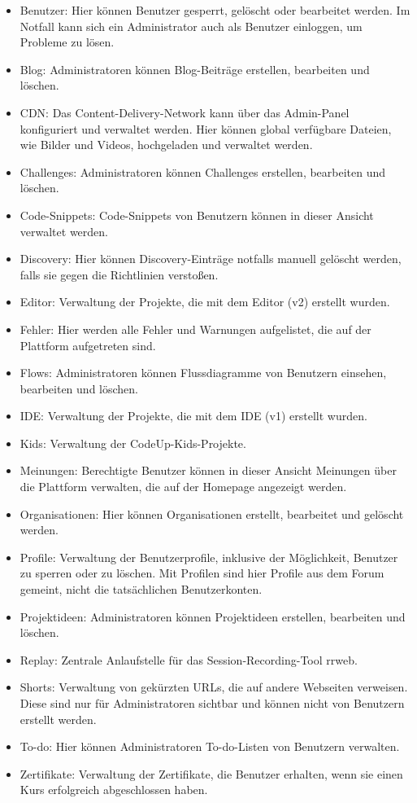 \documentclass[main.tex]{subfiles}
\begin{document}
    \begin{itemize}
        \item Benutzer: Hier können Benutzer gesperrt, gelöscht oder bearbeitet werden.
        Im Notfall kann sich ein Administrator auch als Benutzer einloggen, um Probleme zu lösen.
        \item Blog: Administratoren können Blog-Beiträge erstellen, bearbeiten und löschen.
        \item CDN: Das Content-Delivery-Network kann über das Admin-Panel konfiguriert und verwaltet werden.
        Hier können global verfügbare Dateien, wie Bilder und Videos, hochgeladen und verwaltet werden.
        \item Challenges: Administratoren können Challenges erstellen, bearbeiten und löschen.
        \item Code-Snippets: Code-Snippets von Benutzern können in dieser Ansicht verwaltet werden.
        \item Discovery: Hier können Discovery-Einträge notfalls manuell gelöscht werden, falls sie gegen die Richtlinien verstoßen.
        \item Editor: Verwaltung der Projekte, die mit dem Editor (v2) erstellt wurden.
        \item Fehler: Hier werden alle Fehler und Warnungen aufgelistet, die auf der Plattform aufgetreten sind.
        \item Flows: Administratoren können Flussdiagramme von Benutzern einsehen, bearbeiten und löschen.
        \item IDE: Verwaltung der Projekte, die mit dem IDE (v1) erstellt wurden.
        \item Kids: Verwaltung der CodeUp-Kids-Projekte.
        \item Meinungen: Berechtigte Benutzer können in dieser Ansicht Meinungen über die Plattform verwalten, die auf der Homepage angezeigt werden.
        \item Organisationen: Hier können Organisationen erstellt, bearbeitet und gelöscht werden.
        \item Profile: Verwaltung der Benutzerprofile, inklusive der Möglichkeit, Benutzer zu sperren oder zu löschen.
        Mit Profilen sind hier Profile aus dem Forum gemeint, nicht die tatsächlichen Benutzerkonten.
        \item Projektideen: Administratoren können Projektideen erstellen, bearbeiten und löschen.
        \item Replay: Zentrale Anlaufstelle für das Session-Recording-Tool rrweb.
        \item Shorts: Verwaltung von gekürzten URLs, die auf andere Webseiten verweisen.
        Diese sind nur für Administratoren sichtbar und können nicht von Benutzern erstellt werden.
        \item To-do: Hier können Administratoren To-do-Listen von Benutzern verwalten.
        \item Zertifikate: Verwaltung der Zertifikate, die Benutzer erhalten, wenn sie einen Kurs erfolgreich abgeschlossen haben.
    \end{itemize}
\end{document}
